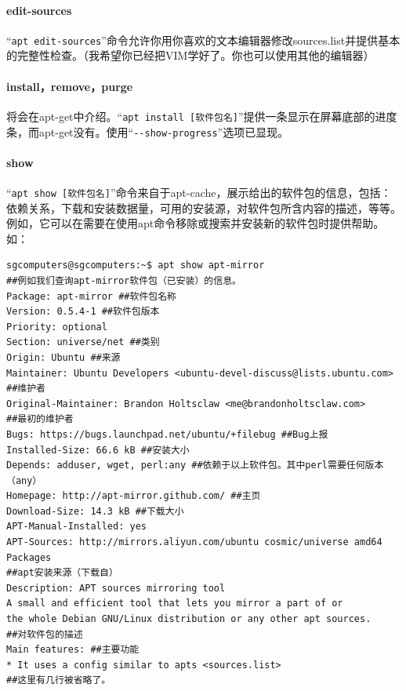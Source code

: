 \paragraph{edit-sources}
“\verb|apt edit-sources|”命令允许你用你喜欢的文本编辑器修改sources.list并提供基本的完整性检查。（我希望你已经把VIM学好了。你也可以使用其他的编辑器）  \par
\paragraph{install，remove，purge}
将会在apt-get中介绍。“\verb|apt install [软件包名]|”提供一条显示在屏幕底部的进度条，而apt-get没有。使用“\verb|--show-progress|”选项已显现。\par
\paragraph{show}
“\verb|apt show [软件包名]|”命令来自于apt-cache，展示给出的软件包的信息，包括：依赖关系，下载和安装数据量，可用的安装源，对软件包所含内容的描述，等等。例如，它可以在需要在使用apt命令移除或搜索并安装新的软件包时提供帮助。如：
\begin{verbatim}
sgcomputers@sgcomputers:~$ apt show apt-mirror
##例如我们查询apt-mirror软件包（已安装）的信息。
Package: apt-mirror ##软件包名称
Version: 0.5.4-1 ##软件包版本
Priority: optional
Section: universe/net ##类别
Origin: Ubuntu ##来源
Maintainer: Ubuntu Developers <ubuntu-devel-discuss@lists.ubuntu.com>
##维护者
Original-Maintainer: Brandon Holtsclaw <me@brandonholtsclaw.com>
##最初的维护者
Bugs: https://bugs.launchpad.net/ubuntu/+filebug ##Bug上报
Installed-Size: 66.6 kB ##安装大小
Depends: adduser, wget, perl:any ##依赖于以上软件包。其中perl需要任何版本（any）
Homepage: http://apt-mirror.github.com/ ##主页
Download-Size: 14.3 kB ##下载大小
APT-Manual-Installed: yes
APT-Sources: http://mirrors.aliyun.com/ubuntu cosmic/universe amd64 Packages
##apt安装来源（下载自）
Description: APT sources mirroring tool
A small and efficient tool that lets you mirror a part of or
the whole Debian GNU/Linux distribution or any other apt sources.
##对软件包的描述
Main features: ##主要功能
* It uses a config similar to apts <sources.list>
##这里有几行被省略了。
\end{verbatim}
